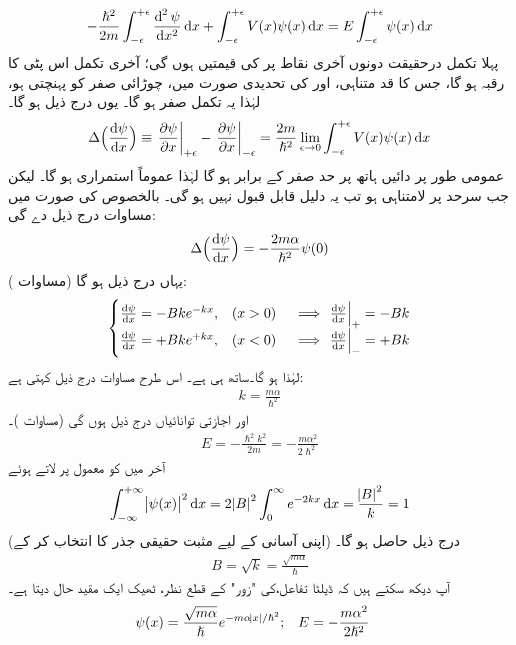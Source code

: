 \begin{align}
-\frac{\hslash^2}{2m}\int_{-\epsilon}^{+\epsilon}\frac{\dif^{\,2}\psi}{\dif x^2}\dif x+\int_{-\epsilon}^{+\epsilon}V(x)\psi(x)\dif x=E\int_{-\epsilon}^{+\epsilon}\psi(x)\dif x
\end{align}
پہلا تکمل درحقیقت  دونوں آخری نقاط پر  کی قیمتیں ہوں گی؛ آخری تکمل اس پٹی کا رقبہ ہو گا، جس کا قد متناہی، اور  کی تحدیدی صورت میں، چوڑائی صفر کو پہنچتی ہو، لہٰذا یہ تکمل صفر ہو گا۔ یوں درج ذیل ہو گا۔
\begin{align}
\Delta\Big(\frac{\dif\psi}{\dif x}\Big)\equiv \left.\frac{\partial \psi}{\partial x}\right|_{+\epsilon}-\left.\frac{\partial \psi}{\partial x}\right|_{-\epsilon}=\frac{2m}{\hslash^2}\lim_{\epsilon\to0}\int_{-\epsilon}^{+\epsilon}V(x)\psi(x)\dif x
\end{align}
 عمومی طور پر دائیں ہاتھ پر حد صفر کے برابر ہو گا لہٰذا  عموماً استمراری ہو گا۔ لیکن جب سرحد پر  لامتناہی ہو تب یہ دلیل قابل قبول نہیں ہو گی۔ بالخصوص  کی صورت میں مساوات   درج ذیل دے گی: 
\begin{align}\label{مساوات_شروڈنگر_مبدا_پر_تفرقات_کا_فرق}
\Delta\Big(\frac{\dif \psi}{\dif x}\Big)=-\frac{2m\alpha}{\hslash^2}\psi(0)
\end{align}
یہاں درج ذیل ہو گا (مساوات ):
\begin{align*}
\begin{cases}
\frac{\dif \psi}{\dif x}=-Bke^{-kx},&(x>0)\quad \implies \left.\frac{\dif\psi}{\dif x}\right|_{+}=-Bk\\
\frac{\dif \psi}{\dif x}=+Bke^{+kx},&(x<0)\quad \implies \left.\frac{\dif\psi}{\dif x}\right|_{-}=+Bk
\end{cases}
\end{align*}
لہٰذا  ہو گا۔ساتھ ہی  ہے۔ اس طرح مساوات   درج ذیل کہتی ہے:
\begin{align}
k=\frac{m\alpha}{\hslash^2 }
\end{align}
اور اجازتی توانائیاں درج ذیل ہوں گی (مساوات )۔
\begin{align}
E=-\frac{\hslash^2 k^2}{2m}=-\frac{m\alpha^2}{2\hslash^2}
\end{align}
 آخر میں  کو معمول پر لاتے ہوئے 
\begin{align*}
\int_{-\infty}^{+\infty}\abs{\psi(x)}^2\dif x=2\abs{B}^2\int_0^{\infty}e^{-2kx}\dif x=\frac{\abs{B}^2}{k}=1
\end{align*}
 (اپنی آسانی کے لیے مثبت حقیقی جذر کا انتخاب کر کے) درج ذیل حاصل ہو گا۔
\begin{align}
B=\sqrt{k}=\frac{\sqrt{m\alpha}}{\hslash}
\end{align}
آپ دیکھ سکتے ہیں کہ ڈیلٹا تفاعل،کی  "زور"  کے قطع نظر،  ٹھیک ایک مقید حال دیتا ہے۔ 
\begin{align}\label{مساوات_شروڈنگر_مقید_حال_ڈیلٹا}
\psi(x)&=\frac{\sqrt{m\alpha}}{\hslash}e^{-m\alpha\abs{x}/\hslash^2};&&E=-\frac{m\alpha^2}{2\hslash^2}
\end{align}

